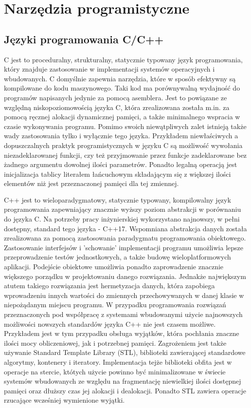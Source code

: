 \section{Narzędzia programistyczne} \label{sec:prog}

\subsection{Języki programowania C/C++} \label{sec:cpp}
C jest to proceduralny, strukturalny, statycznie typowany język programowania, który znajduje
zastosowanie w implementacji systemów operacyjnych i wbudowanych. C domyślnie zapewnia
narzędzia, które w sposób efektywny są kompilowane do kodu maszynowego. Taki kod ma porównywalną
wydajność do programów napisanych jedynie za pomocą asemblera. Jest to powiązane ze względną
niskopoziomowością języka C, która zrealizowana została m.in. za pomocą ręcznej alokacji
dynamicznej pamięci, a także minimalnego wspracia w czasie wykonywania programu. 
Pomimo swoich niewątpliwych zalet istnieją także wady zastosowania tylko i wyłącznie tego
języka. Przykładem niewłaściwych a dopuszczalnych praktyk programistycznych w języku C są
możliwość wywołania niezadeklarowanej funkcji, czy też przyjmowanie przez funkcje zadeklarowane
bez żadnego argumentu dowolnej ilości parametrów. Ponadto legalną operacją jest inicjalizacja
tablicy literałem łańcuchowym składającym się z większej ilości elementów niż jest przeznaczonej
pamięci dla tej zmiennej.

C++ jest to wieloparadygmatowy, statycznie typowany, kompilowalny język programowania zapewniający
znacznie wyższy poziom abstrakcji w porównaniu do języka C. Na potrzeby pracy inżynierskiej
wykorzystano najnowszy, w pełni dostępny, standard tego języka - C++17. 
Wspomniana abstrakcja danych została
zrealizowana za pomocą zastosowania paradygmatu programowania obiektowego. Zastosowanie interfejsów
i 'schowanie' implementacji programu umożliwia lepsze przeprowadzenie testów jednostkowych, a także
budowę wieloplatformowych aplikacji. Podejście obiektowe umożliwia ponadto zaprowadzenie znacznie
większego porządku w projektowaniu danego rozwiązania. Jednakże największym atutem takiego 
rozwiązania jest hermetyzacja danych, która zapobiega wprowadzeniu innych wartości do zmiennych
przechowywanych w danej klasie w niepożądanym miejscu programu.
W przypadku programowania rozwiązań przeznaczonych pod współpracę z systemami wbudowanymi użycie
najnowszych możliwości nowszych standardów języka C++ nie jest czasem możliwe. Przykładem jest
w tym przypadku obsługa wyjątków, która pochłania znaczne ilości mocy obliczeniowej, jak
i potrzebnej pamięci. Zagrożeniem jest także używanie Standard Template Library (STL), biblioteki
zawierającej standardowe algorytmy, kontenery i iteratory. Implementacja tejże biblioteki obfita
jest w operacje na stercie, któtych użycie powinno być minimalizowane w świecie systemów
wbudowanych ze względu na fragmentację niewielkiej ilości dostępnej pamięci oraz dłuższy czas
jej alokacji i dealokacji. Ponadto STL zawiera operacje rzucające wcześniej wymienione wyjątki. 

